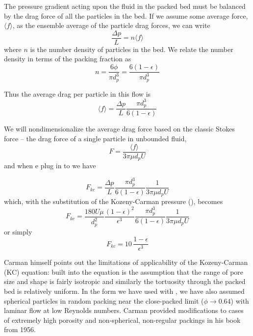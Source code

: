 The pressure gradient acting upon the fluid in the packed bed must be balanced by the drag force of all the particles in the bed. If we assume some average force, $\langle f \rangle$, as the ensemble average of the particle drag forces, we can write
\begin{equation}
    \frac{\Delta p}{L} = n \langle f \rangle
\end{equation}
where $n$ is the number density of particles in the bed. We relate the number density in terms of the packing fraction as
\begin{equation}
    n = \frac{6\phi}{\pi d_p^3} = \frac{6(1-\epsilon)}{\pi d_p^3}
\end{equation}

Thus the average drag per particle in this flow is
\begin{equation}\label{eq:average-drag}
    \langle f \rangle = \frac{\Delta p}{L}\frac{\pi d_p^3}{6(1-\epsilon)}
\end{equation}

We will nondimensionalize the average drag force based on the classic Stokes force -- the drag force of a single particle in unbounded fluid,
\begin{equation}\label{eq:non-dim-drag}
    F = \frac{\langle f \rangle}{3\pi \mu d_p U}
\end{equation}
and when e plug in  to  we have

\begin{equation}
    F_{kc} = \frac{\Delta p}{L}\frac{\pi d_p^3}{6(1-\epsilon)}\frac{1}{3\pi \mu d_p U}
\end{equation}
which, with the substitution of the Kozeny-Carman pressure (), becomes
\begin{equation}
    F_{kc} = \frac{180 U \mu}{d_p^2} \frac{(1-\epsilon)^2}{\epsilon^3}\frac{\pi d_p^3}{6(1-\epsilon)}\frac{1}{3\pi \mu d_p U}
\end{equation}
or simply
\begin{equation}\label{eq:K-C-non-dim}
    F_{kc} = 10\, \frac{1-\epsilon}{\epsilon^3}
\end{equation}

Carman himself\cite{Carman1956} points out the limitations of applicability of the Kozeny-Carman (KC) equation: built into the equation is the assumption that the range of pore size and shape is fairly isotropic and similarly the tortuosity through the packed bed is relatively uniform. In the form we have used with , we have also assumed spherical particles in random packing near the close-packed limit ($\phi \rightarrow 0.64$) with laminar flow at low Reynolds numbers. Carman provided modifications to cases of extremely high porosity and non-spherical, non-regular packings in his book from 1956.\cite{Carman1956}

